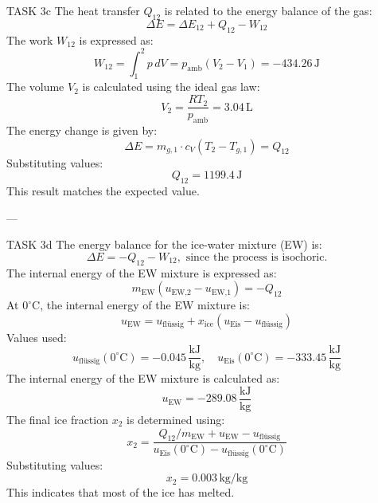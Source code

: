 TASK 3c  
The heat transfer \( Q_{12} \) is related to the energy balance of the gas:  
\[
\Delta E = \Delta E_{12} + Q_{12} - W_{12}
\]  
The work \( W_{12} \) is expressed as:  
\[
W_{12} = \int_{1}^{2} p \, dV = p_{\text{amb}} (V_2 - V_1) = -434.26 \, \text{J}
\]  
The volume \( V_2 \) is calculated using the ideal gas law:  
\[
V_2 = \frac{R T_2}{p_{\text{amb}}} = 3.04 \, \text{L}
\]  
The energy change is given by:  
\[
\Delta E = m_{g,1} \cdot c_V (T_{2} - T_{g,1}) = Q_{12}
\]  
Substituting values:  
\[
Q_{12} = 1199.4 \, \text{J}
\]  
This result matches the expected value.

---

TASK 3d  
The energy balance for the ice-water mixture (EW) is:  
\[
\Delta E = -Q_{12} - W_{12}, \text{ since the process is isochoric.}
\]  
The internal energy of the EW mixture is expressed as:  
\[
m_{\text{EW}} (u_{\text{EW,2}} - u_{\text{EW,1}}) = -Q_{12}
\]  
At \( 0^\circ\text{C} \), the internal energy of the EW mixture is:  
\[
u_{\text{EW}} = u_{\text{flüssig}} + x_{\text{ice}} (u_{\text{Eis}} - u_{\text{flüssig}})
\]  
Values used:  
\[
u_{\text{flüssig}}(0^\circ\text{C}) = -0.045 \, \frac{\text{kJ}}{\text{kg}}, \quad u_{\text{Eis}}(0^\circ\text{C}) = -333.45 \, \frac{\text{kJ}}{\text{kg}}
\]  
The internal energy of the EW mixture is calculated as:  
\[
u_{\text{EW}} = -289.08 \, \frac{\text{kJ}}{\text{kg}}
\]  
The final ice fraction \( x_2 \) is determined using:  
\[
x_2 = \frac{Q_{12} / m_{\text{EW}} + u_{\text{EW}} - u_{\text{flüssig}}}{u_{\text{Eis}}(0^\circ\text{C}) - u_{\text{flüssig}}(0^\circ\text{C})}
\]  
Substituting values:  
\[
x_2 = 0.003 \, \text{kg/kg}
\]  
This indicates that most of the ice has melted.